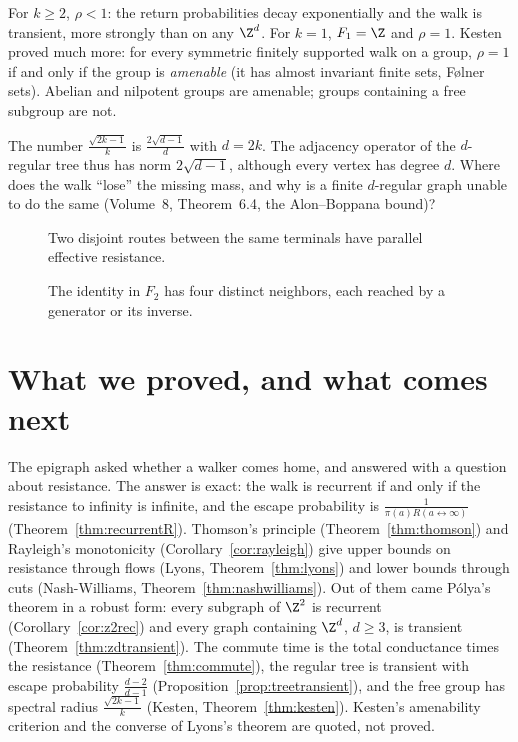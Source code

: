 For $k\ge2$, $\rho<1$: the return probabilities decay exponentially and the walk is transient, more strongly than on any $\Z^d$. For $k=1$, $F_1=\Z$ and $\rho=1$. Kesten proved much more: for every symmetric finitely
supported walk on a group, $\rho=1$ if and only if the group is \emph{amenable} (it has almost invariant finite sets, F\o lner sets). Abelian and nilpotent groups are amenable; groups containing a free subgroup
are not.

\begin{think}
The number $\frac{\sqrt{2k-1}}k$ is $\frac{2\sqrt{d-1}}d$ with $d=2k$. The adjacency operator of the $d$-regular tree thus has norm $2\sqrt{d-1}$, although every vertex has degree $d$. Where does the walk ``lose'' the
missing mass, and why is a finite $d$-regular graph unable to do the same (Volume~8, Theorem~6.4, the Alon--Boppana bound)?
\end{think}

\begin{figure}[ht]
\centering
{}
\caption{Two disjoint routes between the same terminals have parallel effective resistance.}
\label{fig:v12resistanceparallel}
\end{figure}

\begin{figure}[ht]
\centering
{}
\caption{The identity in $F_2$ has four distinct neighbors, each reached by a generator or its inverse.}
\label{fig:v12freegroup}
\end{figure}

\section{What we proved, and what comes next}

The epigraph asked whether a walker comes home, and answered with a question about resistance. The answer is exact: the walk is recurrent if and only if the resistance to infinity is infinite, and the escape probability is $\frac1{\pi(a)R(a\leftrightarrow\infty)}$ (Theorem~\ref{thm:recurrentR}). Thomson's principle (Theorem~\ref{thm:thomson}) and Rayleigh's monotonicity (Corollary~\ref{cor:rayleigh}) give upper bounds on resistance through flows (Lyons, Theorem~\ref{thm:lyons}) and lower bounds through cuts (Nash-Williams, Theorem~\ref{thm:nashwilliams}). Out of them came P\'olya's theorem in a robust form: every subgraph of $\Z^2$ is recurrent (Corollary~\ref{cor:z2rec}) and every graph containing $\Z^d$, $d\ge3$, is transient (Theorem~\ref{thm:zdtransient}). The commute time is the total conductance times the resistance (Theorem~\ref{thm:commute}), the regular tree is transient with escape probability $\frac{d-2}{d-1}$ (Proposition~\ref{prop:treetransient}), and the free group has spectral radius $\frac{\sqrt{2k-1}}k$ (Kesten, Theorem~\ref{thm:kesten}). Kesten's amenability criterion and the converse of Lyons's theorem are quoted, not proved.

